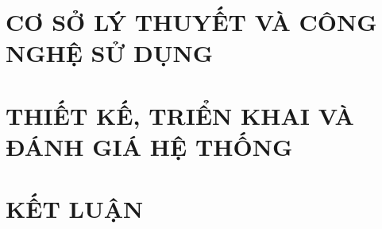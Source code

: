 \documentclass[a4paper,13pt,3p,twoside]{report} %
\renewcommand{\bibname}{Danh_sach_tai_lieu_tham_khao}
\theoremstyle{definition}
\begin{document}
\newpage
\chapter{CƠ SỞ LÝ THUYẾT VÀ CÔNG NGHỆ SỬ DỤNG}
\label{chapter:Methodology}


\newpage
\chapter{THIẾT KẾ, TRIỂN KHAI VÀ ĐÁNH GIÁ HỆ THỐNG}
\label{chapter:Experiment}


%


\newpage
\chapter{KẾT LUẬN} %
\label{chapter:conclusion}


%


\cleardoublepage
\newpage
\pagestyle{empty}
\renewcommand\bibname{TÀI LIỆU THAM KHẢO}
\printbibliography
{}



\end{document}
